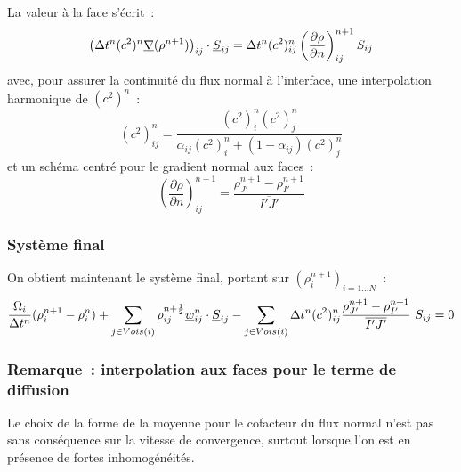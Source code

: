 La valeur à la face s'écrit~:
\begin{equation}
\left(\Delta t^n (c^2)^n \underline{\nabla}(\rho^{n+1})\right)_{ij}\cdot \underline{S}_{ij}
= \Delta t^n (c^2)^n_{ij}
\displaystyle \left( \frac{\partial \rho}{\partial n} \right)^{n+1}_{ij}S_{ij}
\end{equation}
avec, pour assurer la continuité du flux normal à l'interface,
une interpolation harmonique de $(c^2)^n$~:
\begin{equation}\label{Cfbl_Cfmsvl_eq_harmonique_cfmsvl}
\displaystyle(c^2)_{ij}^n
= \frac{(c^2)_{i}^n (c^2)_{j}^n}
{\alpha_{ij}(c^2)_{i}^n+(1-\alpha_{ij})(c^2)_{j}^n}
\end{equation}
et un schéma centré pour le gradient normal aux faces~:
\begin{equation}
\displaystyle \left( \frac{\partial \rho}{\partial n} \right)^{n+1}_{ij}
= \displaystyle\frac{\rho_{J'}^{n+1}-\rho_{I'}^{n+1}}{\overline{I'J'}}
\end{equation}

\subsubsection*{Système final}

On obtient maintenant le système final, portant sur
$(\rho_i^{n+1})_{i=1 \ldots N}$~:
\begin{equation}\label{Cfbl_Cfmsvl_eq_densite_finale_cfmsvl}
\displaystyle\frac{\Omega_i}{\Delta t^n} (\rho_i^{n+1}-\rho_i^n)
+\sum\limits_{j\in Vois(i)}\rho_{ij}^{n+\frac{1}{2}}
\vect{w}_{ij}^n \cdot \vect{S}_{ij}
-\sum\limits_{j\in Vois(i)} \Delta t^n (c^2)_{ij}^n
\displaystyle\frac{\rho_{J'}^{n+1}-\rho_{I'}^{n+1}}{\overline{I'J'}}\ S_{ij}
= 0
\end{equation}



\subsubsection*{Remarque~: interpolation aux faces pour le terme de diffusion}

Le choix de la forme de la moyenne pour le cofacteur du flux
normal n'est pas sans conséquence sur la vitesse de convergence, surtout
lorsque l'on est en présence de fortes inhomogénéités.

